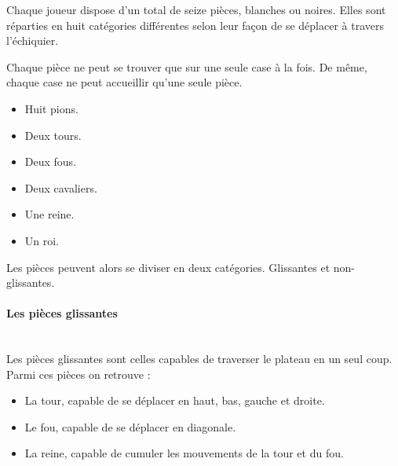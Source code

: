 \huge\documentclass{article}
\begin{document}
Chaque joueur dispose d'un total de seize pièces, blanches ou noires. Elles sont réparties en huit catégories différentes selon leur façon de se déplacer à travers l'échiquier.

Chaque pièce ne peut se trouver que sur une seule case à la fois. De même, chaque case ne peut accueillir qu'une seule pièce.

\begin{itemize}
    \item Huit pions.
    \item Deux tours.
    \item Deux fous.
    \item Deux cavaliers.
    \item Une reine.
    \item Un roi.
\end{itemize}

Les pièces peuvent alors se diviser en deux catégories. Glissantes et non-glissantes.

\paragraph{Les pièces glissantes}
~~\\

Les pièces glissantes sont celles capables de traverser le plateau en un seul coup. Parmi ces pièces on retrouve :

\begin{itemize}
    \item La tour, capable de se déplacer en haut, bas, gauche et droite.
    \item Le fou, capable de se déplacer en diagonale.
    \item La reine, capable de cumuler les mouvements de la tour et du fou.
\end{itemize}
\end{document}
